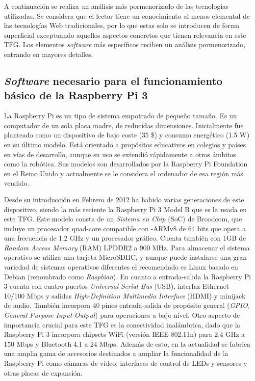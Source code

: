 A continuación se realiza un análisis más pormenorizado de las tecnologías utilizadas. Se considera que el lector tiene un conocimiento al menos elemental de las tecnologías Web tradicionales, por lo que estas solo se introducen de forma superficial exceptuando aquellos aspectos concretos que tienen relevancia en este TFG. Los elementos \emph{software} más específicos reciben un análisis pormenorizado, entrando en mayores detalles.

\subsection{\emph{Software} necesario para el funcionamiento básico de la Raspberry Pi 3}
La Raspberry Pi es un tipo de sistema empotrado de pequeño tamaño. Es un computador de un sola placa madre, de reducidas dimensiones. Inicialmente fue planteado como un dispositivo de bajo coste (35 \$) y consumo energético (1.5 W) en su último modelo. Está orientado a propósitos educativos en colegios y países en vías de desarrollo, aunque su uso se extendió rápidamente a otros ámbitos como la robótica. Sus modelos son desarrollados por la Raspberry Pi Foundation en el Reino Unido y actualmente se le considera el ordenador de esa región más vendido.

Desde su introducción en Febrero de 2012 ha habido varias generaciones de este dispositivo, siendo la más reciente la Raspberry Pi 3 Model B que es la usada en este TFG. Este modelo consta de un \emph{Sistema en Chip} (\acrshort{SoC}) de Broadcom, que incluye un procesador quad-core compatible con -\acrshort{ARM}v8 de 64 bits que opera a una frecuencia de 1.2 GHz y un procesador gráfico. Cuenta también con 1GB de \emph{Random Access Memory} (\acrshort{RAM}) \acrshort{LPDDR2} a 900 MHz. Para almacenar el sistema operativo se utiliza una tarjeta \acrshort{MicroSDHC}, y aunque puede instalarse una gran variedad de sistemas operativos diferentes el recomendado es Linux basado en Debian (renombrado como \emph{Raspbian}). En cuanto a entrada-salida la Raspberry Pi 3 cuenta con cuatro puertos \emph{Universal Serial Bus} (\acrshort{USB}), interfaz Ethernet 10/100 Mbps y salidas \emph{High-Definition Multimedia Interface} (\acrshort{HDMI}) y minijack de audio. También incorpora 40 pines entrada-salida de propósito general (\emph{\acrshort{GPIO}, General Purpose Input-Output}) para operaciones a bajo nivel. Otro aspecto de importancia crucial para este TFG es la conectividad inalámbrica, dado que la Raspberry Pi 3 incorpora chipsets \acrshort{WiFi} (versión \acrshort{IEEE} 802.11n) para 2.4 GHz a 150 Mbps y Bluetooth 4.1 a 24 Mbps. Además de esto, en la actualidad se fabrica una amplia gama de accesorios destinados a ampliar la funcionalidad de la Raspberry Pi como cámaras de vídeo, interfaces de control de \acrshort{LED}s y sensores y otras placas de expansión.

